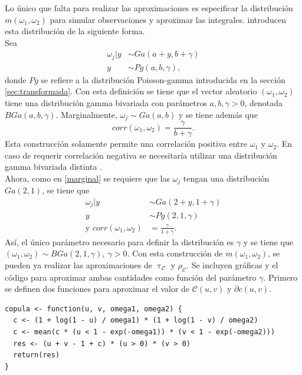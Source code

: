 \documentclass[11pt,a4paper]{article}
\begin{document}
Lo único que falta para realizar las aproximaciones es especificar la distribución $m(\omega_1, \omega_2)$ para simular observaciones y aproximar las integrales. \citet{nieto} introducen esta distribución de la siguiente forma.\\

Sea
\begin{align*}
\omega_j | y &\sim Ga(a + y, b + \gamma)\\
y &\sim Pg(a, b, \gamma),
\end{align*}
donde $Pg$ se refiere a la distribución Poisson-gamma introducida en la sección \ref{sec:transformada}. Con esta definición se tiene que el vector aleatorio $(\omega_1, \omega_2)$ tiene una distribución gamma bivariada con parámetros $a, b, \gamma > 0$, denotada $BGa(a, b, \gamma)$. Marginalmente, $\omega_j \sim Ga(a, b)$ y se tiene además que $$corr(\omega_1, \omega_2) = \frac{\gamma}{b + \gamma}.$$ Esta construcción solamente permite una correlación positiva entre $\omega_1$ y $\omega_2$. En caso de requerir correlación negativa se necesitaría utilizar una distribución gamma bivariada distinta \citep{nieto}.\\

Ahora, como en \eqref{marginal} se requiere que las $\omega_j$ tengan una distribución $Ga(2, 1)$, se tiene que 
\begin{align} \label{eq_omegas}
\omega_j | y &\sim Ga(2 + y, 1 + \gamma) \nonumber\\
y &\sim Pg(2, 1, \gamma)\\
\text{y } corr(\omega_1, \omega_2) &= \frac{\gamma}{1 + \gamma}. \nonumber
\end{align}
Así, el único parámetro necesario para definir la distribución es $\gamma$ y se tiene que $(\omega_1, \omega_2) \sim BGa(2, 1, \gamma), \ \gamma >0$. Con esta construcción de $m(\omega_1, \omega_2)$, se pueden ya realizar las aproximaciones de $\uptau_\mathcal{C}$ y $\rho_\mathcal{C}$. Se incluyen gráficas y el código para aproximar ambas cantidades como función del parámetro $\gamma$. Primero se definen dos funciones para aproximar el valor de $\mathcal{C}(u, v)$ y $\partial c(u, v)$.

\begin{lstlisting}
copula <- function(u, v, omega1, omega2) {
  c <- (1 + log(1 - u) / omega1) * (1 + log(1 - v) / omega2)
  c <- mean(c * (u < 1 - exp(-omega1)) * (v < 1 - exp(-omega2)))
  res <- (u + v - 1 + c) * (u > 0) * (v > 0)
  return(res)
}
\end{lstlisting} 
\end{document}
